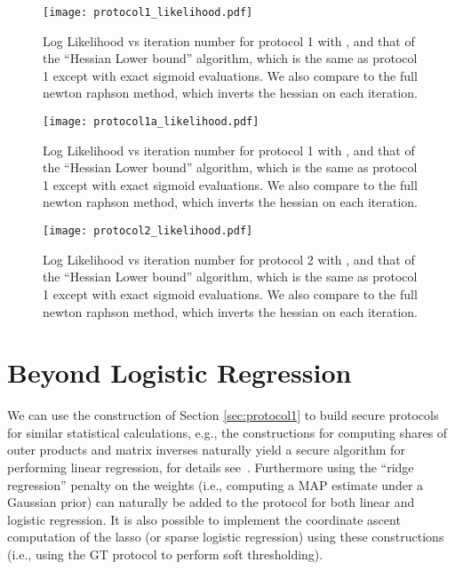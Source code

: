\documentclass[11pt]{article}
\begin{document}
\begin{figure}[h]
  \centering
      \texttt{[image: protocol1\_likelihood.pdf]}
  \caption{Log Likelihood vs iteration number for protocol 1 with , and that of the ``Hessian Lower bound'' algorithm, which is the same as protocol 1 except with exact sigmoid evaluations.  We also compare to the full newton raphson method, which inverts the hessian on each iteration.}
\label{fig_like1}
\end{figure}


\begin{figure}[h]
  \centering
      \texttt{[image: protocol1a\_likelihood.pdf]}
  \caption{Log Likelihood vs iteration number for protocol 1 with , and that of the ``Hessian Lower bound'' algorithm, which is the same as protocol 1 except with exact sigmoid evaluations.  We also compare to the full newton raphson method, which inverts the hessian on each iteration.}
\label{fig_like1a}
\end{figure}


\begin{figure}[h]
  \centering
      \texttt{[image: protocol2\_likelihood.pdf]}
  \caption{Log Likelihood vs iteration number for protocol 2 with , and that of the ``Hessian Lower bound'' algorithm, which is the same as protocol 1 except with exact sigmoid evaluations.  We also compare to the full newton raphson method, which inverts the hessian on each iteration.}
\label{fig_like2}
\end{figure}


\section{Beyond Logistic Regression}\label{sec:extension}

We can use the construction of Section \ref{sec:protocol1} to build secure protocols for similar statistical calculations, e.g.,  the constructions for computing shares of outer products and matrix inverses naturally yield a secure algorithm for performing linear regression, for details see~\cite{fhn:10}.  Furthermore using the ``ridge regression'' penalty on the weights (i.e., computing a MAP estimate under a Gaussian prior) can naturally be added to the protocol for both linear and logistic regression.  It is also possible to implement the coordinate ascent computation of the lasso (or sparse logistic regression) using these constructions (i.e., using the GT protocol to perform soft thresholding).
\end{document}
